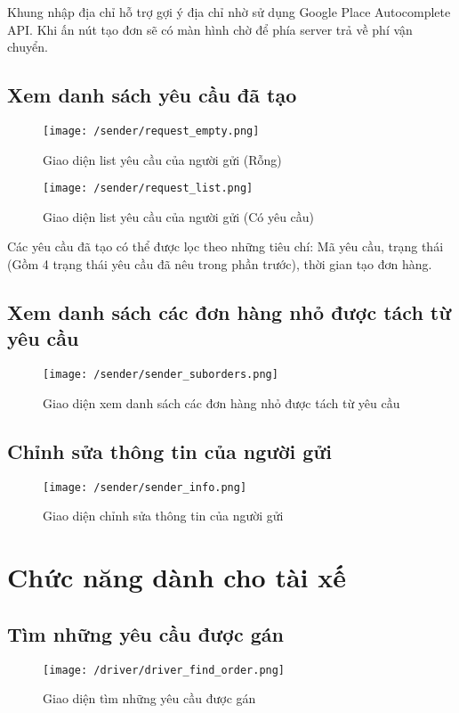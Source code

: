 				Khung nhập địa chỉ hỗ trợ gợi ý địa chỉ nhờ sử dụng Google Place Autocomplete API. Khi ấn nút tạo đơn sẽ có màn hình chờ để phía server trả về phí vận chuyển.
			
		
			\subsection{Xem danh sách yêu cầu đã tạo}
				\begin{figure}[H]
					\texttt{[image: /sender/request\_empty.png]}
					\centering
					\caption{Giao diện list yêu cầu của người gửi (Rỗng)}
				\end{figure}
				
				\begin{figure}[H]
					\texttt{[image: /sender/request\_list.png]}
					\centering
					\caption{Giao diện list yêu cầu của người gửi (Có yêu cầu)}
				\end{figure}
		
				Các yêu cầu đã tạo có thể được lọc theo những tiêu chí: Mã yêu cầu, trạng thái (Gồm 4 trạng thái yêu cầu đã nêu trong phần trước), thời gian tạo đơn hàng.
			
			
			\subsection{Xem danh sách các đơn hàng nhỏ được tách từ yêu cầu}
				\begin{figure}[H]
					\texttt{[image: /sender/sender\_suborders.png]}
					\centering
					\caption{Giao diện xem danh sách các đơn hàng nhỏ được tách từ yêu cầu}
				\end{figure}
			
			\subsection{Chỉnh sửa thông tin của người gửi}
				\begin{figure}[H]
					\texttt{[image: /sender/sender\_info.png]}
					\centering
					\caption{Giao diện chỉnh sửa thông tin của người gửi}
				\end{figure}
			
		\section{Chức năng dành cho tài xế}
			\subsection{Tìm những yêu cầu được gán}
				\begin{figure}[H]
					\texttt{[image: /driver/driver\_find\_order.png]}
					\centering
					\caption{Giao diện tìm những yêu cầu được gán}
				\end{figure}
			
